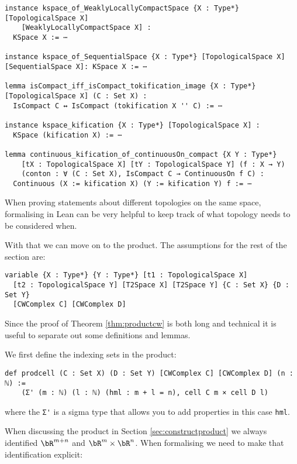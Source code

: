 \begin{lstlisting}
instance kspace_of_WeaklyLocallyCompactSpace {X : Type*}[TopologicalSpace X]
    [WeaklyLocallyCompactSpace X] : 
  KSpace X := ⋯

instance kspace_of_SequentialSpace {X : Type*} [TopologicalSpace X] [SequentialSpace X]: KSpace X := ⋯

lemma isCompact_iff_isCompact_tokification_image {X : Type*} [TopologicalSpace X] (C : Set X) :
  IsCompact C ↔ IsCompact (tokification X '' C) := ⋯

instance kspace_kification {X : Type*} [TopologicalSpace X] : 
  KSpace (kification X) := ⋯

lemma continuous_kification_of_continuousOn_compact {X Y : Type*} 
    [tX : TopologicalSpace X] [tY : TopologicalSpace Y] (f : X → Y) 
    (conton : ∀ (C : Set X), IsCompact C → ContinuousOn f C) :
  Continuous (X := kification X) (Y := kification Y) f := ⋯
\end{lstlisting}

When proving statements about different topologies on the same space, formalising in Lean can be very helpful to keep track of what topology needs to be considered when. 

With that we can move on to the product. 
The assumptions for the rest of the section are:

\begin{lstlisting}
variable {X : Type*} {Y : Type*} [t1 : TopologicalSpace X] 
  [t2 : TopologicalSpace Y] [T2Space X] [T2Space Y] {C : Set X} {D : Set Y} 
  [CWComplex C] [CWComplex D]
\end{lstlisting}

Since the proof of Theorem \ref{thm:productcw} is both long and technical it is useful to separate out some definitions and lemmas. 

We first define the indexing sets in the product:
\href{https://github.com/scholzhannah/CWComplexes/blob/7be4872a05b534011cc969eb5b80a4b7f0bf57e2/CWcomplexes/Product.lean#L29-L31}{\faExternalLink}

\begin{lstlisting}
def prodcell (C : Set X) (D : Set Y) [CWComplex C] [CWComplex D] (n : ℕ) :=
    (Σ' (m : ℕ) (l : ℕ) (hml : m + l = n), cell C m × cell D l)
\end{lstlisting}

where the \lstinline{Σ'} is a sigma type that allows you to add properties in this case \lstinline{hml}. 

When discussing the product in Section \ref{sec:constructproduct} we always identified $\bR^{m + n}$ and $\bR^m \times \bR^n$. 
When formalising we need to make that identification explicit: 
\href{https://github.com/scholzhannah/CWComplexes/blob/7be4872a05b534011cc969eb5b80a4b7f0bf57e2/CWcomplexes/Product.lean#L33-L36}{\faExternalLink}

